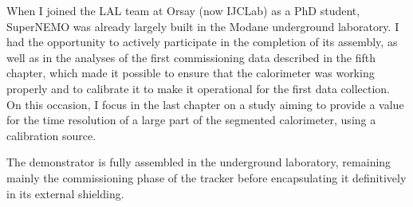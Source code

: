 When I joined the LAL team at Orsay (now IJCLab) as a PhD student, SuperNEMO was already largely built in the Modane underground laboratory.
I had the opportunity to actively participate in the completion of its assembly, as well as in the analyses of the first commissioning data described in the fifth chapter, which made it possible to ensure that the calorimeter was working properly and to calibrate it to make it operational for the first data collection.
On this occasion, I focus in the last chapter on a study aiming to provide a value for the time resolution of a large part of the segmented calorimeter, using a calibration source.

The demonstrator is fully assembled in the underground laboratory, remaining mainly the commissioning phase of the tracker before encapsulating it definitively in its external shielding.
